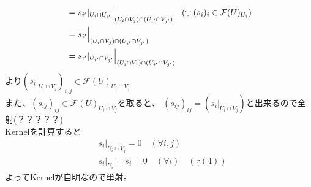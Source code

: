 \documentclass[dvipdfmx,a4paper,11pt]{jsbook}
\begin{document}
{\begin{align*}
    &= s_{i'} |_{U_{i}\cap U_{i'}}\Bigl|_{(U_{i} \cap V_{j}) \cap (U_{i'} \cap V_{j'})} \quad (\because (s_{i})_{i} \in \mathcal{F}(U)_{U_{i}})\\
    &= s_{i'} \Bigl|_{(U_{i} \cap V_{j}) \cap (U_{i'} \cap V_{j'})}\\
    &= s_{i'} |_{U_{i'} \cap V_{j'}}\Bigl|_{(U_{i} \cap V_{j}) \cap (U_{i'} \cap V_{j'})}
  \end{align*}
  より$(s_{i}|_{U_{i}\cap V_{j}})_{i,j}\in \mathcal{F}(U)_{U_{i} \cap V_{j}}$\\
  また、$(s_{ij})_{ij}\in \mathcal{F}(U)_{U_{i}\cap V_{j}}$を取ると、
  $(s_{ij})_{ij} = (s_{i}|_{U_{i} \cap V_{j}})$と出来るので全射(？？？？？)\\
  Kernelを計算すると
  \begin{align*}
    &s_{i}|_{U_{i}\cap V_{j}} = 0 \quad (\forall i,j)\\
    &s_{i}|_{U_{i}}=s_{i} = 0 \quad (\forall i) \quad (\because (4))
  \end{align*}
  よってKernelが自明なので単射。
}{}
\end{document}
